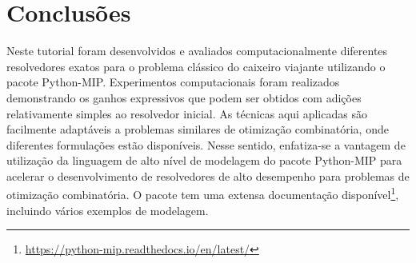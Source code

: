 \documentclass[a4paper,11pt,fleqn]{article}
\begin{document}
\section{Conclusões}

Neste tutorial foram desenvolvidos e avaliados computacionalmente diferentes resolvedores exatos para o problema clássico do caixeiro viajante utilizando o pacote Python-MIP. Experimentos computacionais foram realizados demonstrando os ganhos expressivos que podem ser obtidos com adições relativamente simples ao resolvedor inicial. As técnicas aqui aplicadas são facilmente adaptáveis a problemas similares de otimização combinatória, onde diferentes formulações estão disponíveis. Nesse sentido, enfatiza-se a vantagem de utilização da linguagem de alto nível de modelagem do pacote Python-MIP para acelerar o desenvolvimento de resolvedores de alto desempenho para problemas de otimização combinatória. O pacote tem uma extensa documentação disponível\footnote{\url{https://python-mip.readthedocs.io/en/latest/}}, incluindo vários exemplos de modelagem.



\end{document}
